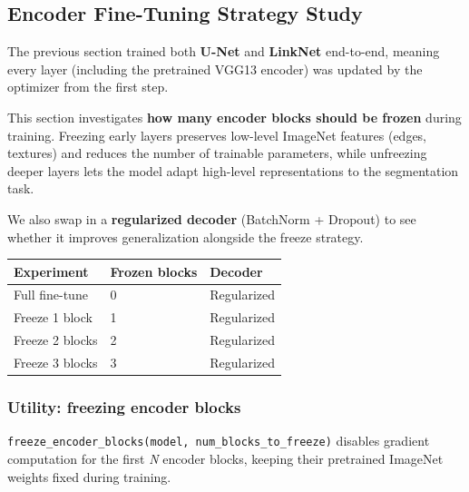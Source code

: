 \documentclass[11pt]{article}
\begin{document}
    \subsection{Encoder Fine-Tuning Strategy
Study}\label{encoder-fine-tuning-strategy-study}

The previous section trained both \textbf{U-Net} and \textbf{LinkNet}
end-to-end, meaning every layer (including the pretrained VGG13 encoder)
was updated by the optimizer from the first step.

This section investigates \textbf{how many encoder blocks should be
frozen} during training. Freezing early layers preserves low-level
ImageNet features (edges, textures) and reduces the number of trainable
parameters, while unfreezing deeper layers lets the model adapt
high-level representations to the segmentation task.

We also swap in a \textbf{regularized decoder} (BatchNorm + Dropout) to
see whether it improves generalization alongside the freeze strategy.

{\def\LTcaptype{table} %
\begin{longtable}[]{@{}lll@{}}
\toprule\noalign{}
Experiment & Frozen blocks & Decoder \\
\midrule\noalign{}
\endhead
\bottomrule\noalign{}
\endlastfoot
Full fine-tune & 0 & Regularized \\
Freeze 1 block & 1 & Regularized \\
Freeze 2 blocks & 2 & Regularized \\
Freeze 3 blocks & 3 & Regularized \\
\end{longtable}
}

    \subsubsection{Utility: freezing encoder
blocks}\label{utility-freezing-encoder-blocks}

\texttt{freeze\_encoder\_blocks(model,\ num\_blocks\_to\_freeze)}
disables gradient computation for the first \emph{N} encoder blocks,
keeping their pretrained ImageNet weights fixed during training.
\end{document}
